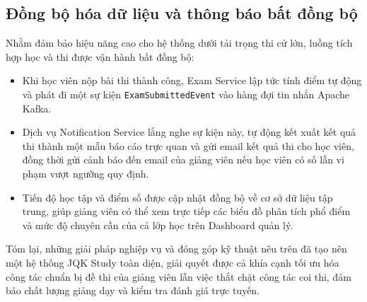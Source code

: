 \documentclass[../DoAn.tex]{subfiles}
\begin{document}
\subsection{Đồng bộ hóa dữ liệu và thông báo bất đồng bộ}
Nhằm đảm bảo hiệu năng cao cho hệ thống dưới tải trọng thi cử lớn, luồng tích hợp học và thi được vận hành bất đồng bộ:
\begin{itemize}
    \item Khi học viên nộp bài thi thành công, Exam Service lập tức tính điểm tự động và phát đi một sự kiện \texttt{ExamSubmittedEvent} vào hàng đợi tin nhắn Apache Kafka.
    \item Dịch vụ Notification Service lắng nghe sự kiện này, tự động kết xuất kết quả thi thành một mẫu báo cáo trực quan và gửi email kết quả thi cho học viên, đồng thời gửi cảnh báo đến email của giảng viên nếu học viên có số lần vi phạm vượt ngưỡng quy định.
    \item Tiến độ học tập và điểm số được cập nhật đồng bộ về cơ sở dữ liệu tập trung, giúp giảng viên có thể xem trực tiếp các biểu đồ phân tích phổ điểm và mức độ chuyên cần của cả lớp học trên Dashboard quản lý.
\end{itemize}

Tóm lại, những giải pháp nghiệp vụ và đóng góp kỹ thuật nêu trên đã tạo nên một hệ thống JQK Study toàn diện, giải quyết được cả khía cạnh tối ưu hóa công tác chuẩn bị đề thi của giảng viên lẫn việc thắt chặt công tác coi thi, đảm bảo chất lượng giảng dạy và kiểm tra đánh giá trực tuyến.
\end{document}

